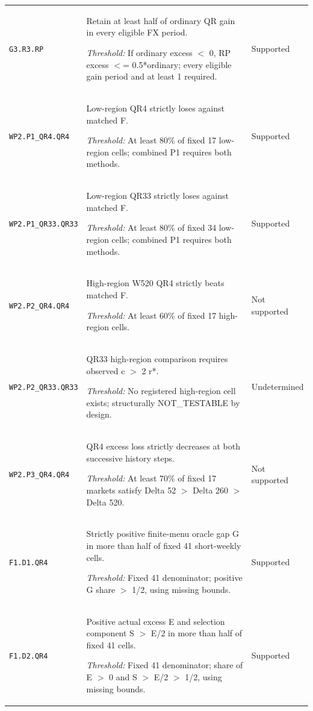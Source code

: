 \documentclass[12pt,a4paper]{article}
\begin{document}
{\begin{longtable}{p{2.0cm}p{10.5cm}p{2.5cm}}
\texttt{G3.\allowbreak{}R3.\allowbreak{}RP} & Retain at least half of ordinary QR gain in every eligible FX period.\par\emph{Threshold:} If ordinary excess \ensuremath{<} 0,\allowbreak{} RP excess \ensuremath{<}=\allowbreak{} 0.5*ordinary; every eligible gain period and at least 1 required. & Supported \\[3pt]
\texttt{WP2.\allowbreak{}P1\_QR4.\allowbreak{}QR4} & Low-region QR4 strictly loses against matched F.\par\emph{Threshold:} At least 80\% of fixed 17 low-region cells; combined P1 requires both methods. & Supported \\[3pt]
\texttt{WP2.\allowbreak{}P1\_QR33.\allowbreak{}QR33} & Low-region QR33 strictly loses against matched F.\par\emph{Threshold:} At least 80\% of fixed 34 low-region cells; combined P1 requires both methods. & Supported \\[3pt]
\texttt{WP2.\allowbreak{}P2\_QR4.\allowbreak{}QR4} & High-region W520 QR4 strictly beats matched F.\par\emph{Threshold:} At least 60\% of fixed 17 high-region cells. & Not supported \\[3pt]
\texttt{WP2.\allowbreak{}P2\_QR33.\allowbreak{}QR33} & QR33 high-region comparison requires observed c \ensuremath{>} 2 r*.\par\emph{Threshold:} No registered high-region cell exists; structurally NOT\_\allowbreak{}TESTABLE by design. & Undetermined \\[3pt]
\texttt{WP2.\allowbreak{}P3\_QR4.\allowbreak{}QR4} & QR4 excess loss strictly decreases at both successive history steps.\par\emph{Threshold:} At least 70\% of fixed 17 markets satisfy Delta 52 \ensuremath{>} Delta 260 \ensuremath{>} Delta 520. & Not supported \\[3pt]
\texttt{F1.\allowbreak{}D1.\allowbreak{}QR4} & Strictly positive finite-menu oracle gap G in more than half of fixed 41 short-weekly cells.\par\emph{Threshold:} Fixed 41 denominator; positive G share \ensuremath{>} 1/\allowbreak{}2,\allowbreak{} using missing bounds. & Supported \\[3pt]
\texttt{F1.\allowbreak{}D2.\allowbreak{}QR4} & Positive actual excess E and selection component S \ensuremath{>} E/\allowbreak{}2 in more than half of fixed 41 cells.\par\emph{Threshold:} Fixed 41 denominator; share of E \ensuremath{>} 0 and S \ensuremath{>} E/\allowbreak{}2 \ensuremath{>} 1/\allowbreak{}2,\allowbreak{} using missing bounds. & Supported \\[3pt]

\end{longtable}}
\end{document}
